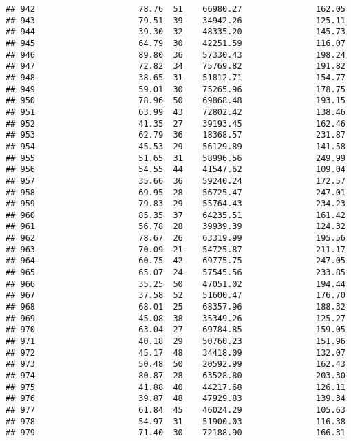 \documentclass[
]{article}
\begin{document}
\begin{verbatim}
## 942                     78.76  51    66980.27               162.05
## 943                     79.51  39    34942.26               125.11
## 944                     39.30  32    48335.20               145.73
## 945                     64.79  30    42251.59               116.07
## 946                     89.80  36    57330.43               198.24
## 947                     72.82  34    75769.82               191.82
## 948                     38.65  31    51812.71               154.77
## 949                     59.01  30    75265.96               178.75
## 950                     78.96  50    69868.48               193.15
## 951                     63.99  43    72802.42               138.46
## 952                     41.35  27    39193.45               162.46
## 953                     62.79  36    18368.57               231.87
## 954                     45.53  29    56129.89               141.58
## 955                     51.65  31    58996.56               249.99
## 956                     54.55  44    41547.62               109.04
## 957                     35.66  36    59240.24               172.57
## 958                     69.95  28    56725.47               247.01
## 959                     79.83  29    55764.43               234.23
## 960                     85.35  37    64235.51               161.42
## 961                     56.78  28    39939.39               124.32
## 962                     78.67  26    63319.99               195.56
## 963                     70.09  21    54725.87               211.17
## 964                     60.75  42    69775.75               247.05
## 965                     65.07  24    57545.56               233.85
## 966                     35.25  50    47051.02               194.44
## 967                     37.58  52    51600.47               176.70
## 968                     68.01  25    68357.96               188.32
## 969                     45.08  38    35349.26               125.27
## 970                     63.04  27    69784.85               159.05
## 971                     40.18  29    50760.23               151.96
## 972                     45.17  48    34418.09               132.07
## 973                     50.48  50    20592.99               162.43
## 974                     80.87  28    63528.80               203.30
## 975                     41.88  40    44217.68               126.11
## 976                     39.87  48    47929.83               139.34
## 977                     61.84  45    46024.29               105.63
## 978                     54.97  31    51900.03               116.38
## 979                     71.40  30    72188.90               166.31

\end{verbatim}
\end{document}
